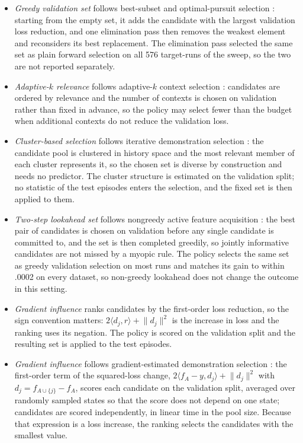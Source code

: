 \documentclass[preprint,12pt]{elsarticle}
\begin{document}
\begin{itemize}
\item \emph{Greedy validation set} follows best-subset and optimal-pursuit
  selection \citep{zhu2025best}: starting from the empty set, it adds the
  candidate with the largest validation loss reduction, and one elimination
  pass then removes the weakest element and reconsiders its best replacement.
  The elimination pass selected the same set as plain forward selection on all
  576 target-runs of the sweep, so the two are not reported separately.
\item \emph{Adaptive-$k$ relevance} follows adaptive-$k$ context selection
  \citep{taguchi2025adaptive}: candidates are ordered by relevance and the
  number of contexts is chosen on validation rather than fixed in advance, so
  the policy may select fewer than the budget when additional contexts do not
  reduce the validation loss.
\item \emph{Cluster-based selection} follows iterative demonstration
  selection \citep{qin2023iterative}: the candidate pool is clustered in
  history space and the most relevant member of each cluster represents it, so
  the chosen set is diverse by construction and needs no predictor. The cluster
  structure is estimated on the validation split; no statistic of the test
  episodes enters the selection, and the fixed set is then applied to them.
\item \emph{Two-step lookahead set} follows nongreedy active feature
  acquisition \citep{valancius2023acquisition,norcliffe2025stochastic}: the
  best pair of candidates is chosen on validation before any single candidate
  is committed to, and the set is then completed greedily, so jointly
  informative candidates are not missed by a myopic rule. The policy selects
  the same set as greedy validation selection on most runs and matches its gain
  to within .0002 on every dataset, so non-greedy lookahead does not change the
  outcome in this setting.
\item \emph{Gradient influence} ranks candidates by the first-order loss
  reduction, so the sign convention matters: $2\langle d_j, r\rangle+\lVert
  d_j\rVert^2$ is the increase in loss and the ranking uses its negation. The
  policy is scored on the validation split and the resulting set is applied to
  the test episodes.
\item \emph{Gradient influence} follows gradient-estimated demonstration
  selection \citep{zhang2025linear}: the first-order term of the squared-loss
  change, $2\langle f_A-y, d_j\rangle+\lVert d_j\rVert^2$ with
  $d_j=f_{A\cup\{j\}}-f_A$, scores each candidate on the validation split,
  averaged over randomly sampled states so that the score does not depend on
  one state; candidates are scored independently, in linear time in the pool
  size. Because that expression is a loss increase, the ranking selects the
  candidates with the smallest value.
\end{itemize}
\end{document}
